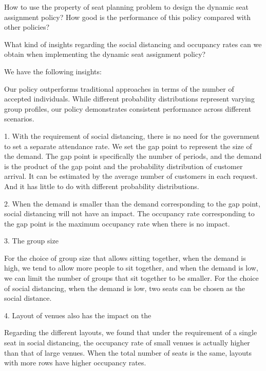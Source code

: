 How to use the property of seat planning problem to design the dynamic seat assignment policy? How good is the performance of this policy compared with other policies?

What kind of insights regarding the social distancing and occupancy rates can we obtain when implementing the dynamic seat assignment policy?


We have the following insights:

Our policy outperforms traditional approaches in terms of the number of accepted individuals. While different probability distributions represent varying group profiles, our policy demonstrates consistent performance across different scenarios.

1.  With the requirement of social distancing, there is no need for the government to set a separate attendance rate. We set the gap point to represent the size of the demand. The gap point is specifically the number of periods, and the demand is the product of the gap point and the probability distribution of customer arrival. It can be estimated by the average number of customers in each request. And it has little to do with different probability distributions.  

2. When the demand is smaller than the demand corresponding to the gap point, social distancing will not have an impact. The occupancy rate corresponding to the gap point is the maximum occupancy rate when there is no impact.

3. The group size 

For the choice of group size that allows sitting together, when the demand is high, we tend to allow more people to sit together, and when the demand is low, we can limit the number of groups that sit together to be smaller. For the choice of social distancing, when the demand is low, two seats can be chosen as the social distance.

4.  Layout of venues also has the impact on the 

Regarding the different layouts, we found that under the requirement of a single seat in social distancing, the occupancy rate of small venues is actually higher than that of large venues. When the total number of seats is the same, layouts with more rows have higher occupancy rates.



